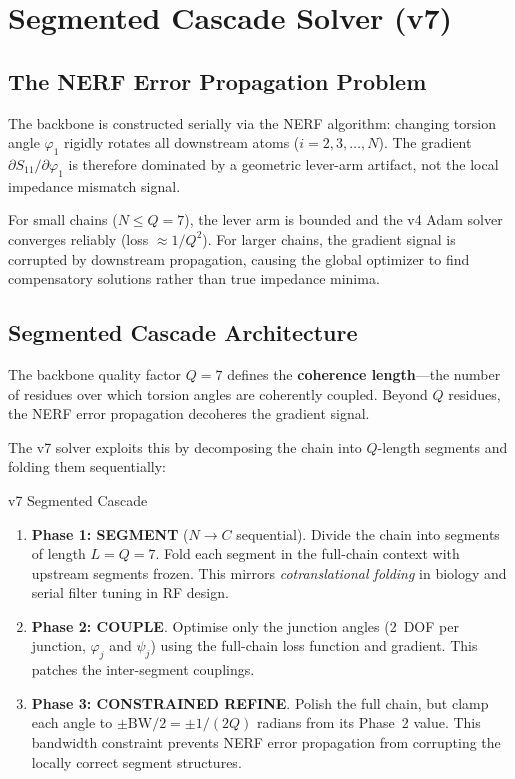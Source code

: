 \section{Segmented Cascade Solver (v7)}
\label{sec:v7_cascade}

\subsection{The NERF Error Propagation Problem}
\label{sec:nerf_error}

The backbone is constructed serially via the NERF algorithm:
changing torsion angle $\varphi_1$ rigidly rotates all downstream
atoms ($i = 2, 3, \ldots, N$).  The gradient
$\partial S_{11}/\partial\varphi_1$ is therefore dominated by a
geometric lever-arm artifact, not the local impedance mismatch
signal.

For small chains ($N \leq Q = 7$), the lever arm is bounded and
the v4 Adam solver converges reliably (loss $\approx 1/Q^2$).
For larger chains, the gradient signal is corrupted by
downstream propagation, causing the global optimizer to find
compensatory solutions rather than true impedance minima.

\subsection{Segmented Cascade Architecture}
\label{sec:cascade_arch}

The backbone quality factor $Q = 7$ defines the \textbf{coherence
length}---the number of residues over which torsion angles are
coherently coupled.  Beyond $Q$ residues, the NERF error
propagation decoheres the gradient signal.

The v7 solver exploits this by decomposing the chain into
$Q$-length segments and folding them sequentially:

\begin{resultbox}{v7 Segmented Cascade}
\begin{enumerate}
\item \textbf{Phase 1: SEGMENT} ($N \to C$ sequential).
    Divide the chain into segments of length $L = Q = 7$.
    Fold each segment in the full-chain context with upstream
    segments frozen.  This mirrors \emph{cotranslational folding}
    in biology and serial filter tuning in RF design.
\item \textbf{Phase 2: COUPLE}.
    Optimise only the junction angles (2~DOF per junction,
    $\varphi_j$ and $\psi_j$) using the full-chain loss function
    and gradient.  This patches the inter-segment couplings.
\item \textbf{Phase 3: CONSTRAINED REFINE}.
    Polish the full chain, but clamp each angle to
    $\pm\text{BW}/2 = \pm 1/(2Q)$ radians from its Phase~2 value.
    This bandwidth constraint prevents NERF error propagation
    from corrupting the locally correct segment structures.
\end{enumerate}
\end{resultbox}

